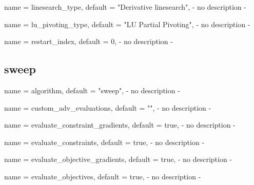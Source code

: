 \begin{parameter}{
    name    = {linesearch_type},
    default = {"Derivative linesearch"},
}
- no description -
\end{parameter}

\begin{parameter}{
    name    = {lu_pivoting_type},
    default = {"LU Partial Pivoting"},
}
- no description -
\end{parameter}

\begin{parameter}{
    name    = {restart_index},
    default = {0},
}
- no description -
\end{parameter}

\subsection{sweep}

\begin{parameter}{
    name    = {algorithm},
    default = {"sweep"},
}
- no description -
\end{parameter}

\begin{parameter}{
    name    = {custom_adv_evaluations},
    default = {""},
}
- no description -
\end{parameter}

\begin{parameter}{
    name    = {evaluate_constraint_gradients},
    default = {true},
}
- no description -
\end{parameter}

\begin{parameter}{
    name    = {evaluate_constraints},
    default = {true},
}
- no description -
\end{parameter}

\begin{parameter}{
    name    = {evaluate_objective_gradients},
    default = {true},
}
- no description -
\end{parameter}

\begin{parameter}{
    name    = {evaluate_objectives},
    default = {true},
}
- no description -
\end{parameter}

